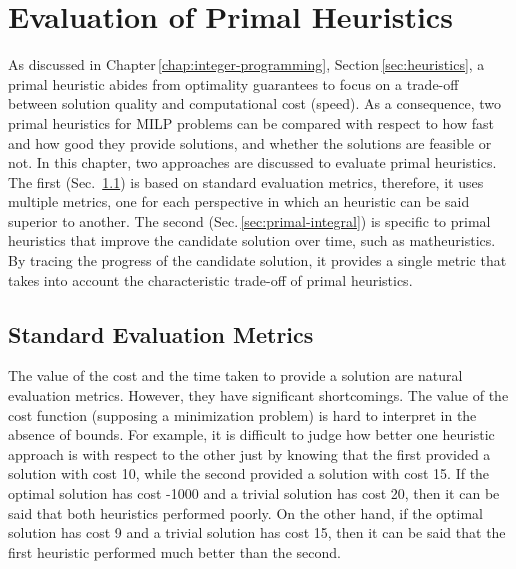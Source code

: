 

\chapter{Evaluation of Primal Heuristics}\label{chap:evaluation}

As discussed in Chapter\,\ref{chap:integer-programming}, Section\,\ref{sec:heuristics}, a primal heuristic abides from optimality guarantees to focus on a trade-off between solution quality and computational cost (speed).
As a consequence, two primal heuristics for MILP problems can be compared with respect to how fast and how good they provide solutions, and whether the solutions are feasible or not.
In this chapter, two approaches are discussed to evaluate primal heuristics.
The first (Sec.~\ref{sec:standard-evaluation-metrics}) is based on standard evaluation metrics, therefore, it uses multiple metrics, one for each perspective in which an heuristic can be said superior to another.
The second (Sec.\,\ref{sec:primal-integral}) is specific to primal heuristics that improve the candidate solution over time, such as matheuristics.
By tracing the progress of the candidate solution, it provides a single metric that takes into account the characteristic trade-off of primal heuristics.


\section{Standard Evaluation Metrics}\label{sec:standard-evaluation-metrics}

The value of the cost and the time taken to provide a solution are natural evaluation metrics.
However, they have significant shortcomings.
The value of the cost function (supposing a minimization problem) is hard to interpret in the absence of bounds.
For example, it is difficult to judge how better one heuristic approach is with respect to the other just by knowing that the first provided a solution with cost 10, while the second provided a solution with cost 15.
If the optimal solution has cost -1000 and a trivial solution has cost 20, then it can be said that both heuristics performed poorly.
On the other hand, if the optimal solution has cost 9 and a trivial solution has cost 15, then it can be said that the first heuristic performed much better than the second.

